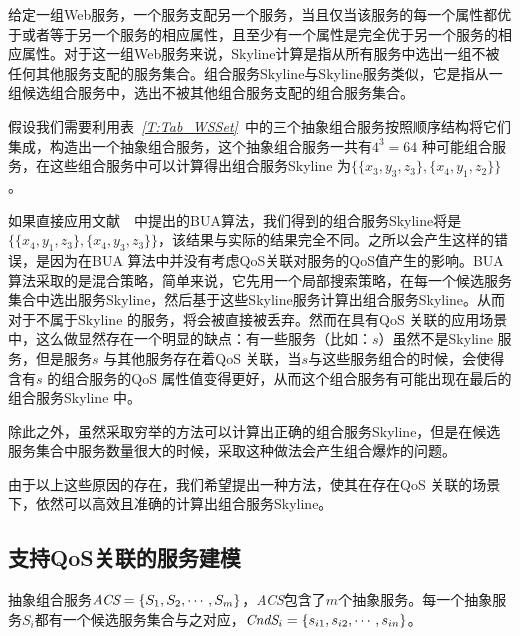 给定一组Web服务，一个服务支配另一个服务，当且仅当该服务的每一个属性都优于或者等于另一个服务的相应属性，且至少有一个属性是完全优于另一个服务的相应属性。对于这一组Web服务来说，Skyline计算是指从所有服务中选出一组不被任何其他服务支配的服务集合。组合服务Skyline与Skyline服务类似，它是指从一组候选组合服务中，选出不被其他组合服务支配的组合服务集合。

\begin{example}[组合服务Skyline]\label{EX:Examp_CSKY}

假设我们需要利用表\emph{~\ref{T:Tab_WSSet}~}中的三个抽象组合服务按照顺序结构将它们集成，构造出一个抽象组合服务，这个抽象组合服务一共有$4^{3}=64$ 种可能组合服务，在这些组合服务中可以计算得出组合服务Skyline 为$\{\{x_{3},y_{3},z_{3}\},\{x_{4},y_{1},z_{2}\}\}$。
\end{example}

如果直接应用文献~\cite{yu2013efficient}~中提出的BUA算法，我们得到的组合服务Skyline将是$\{\{x_{4},y_{1},z_{3}\},\{x_{4},y_{3},z_{3}\}\}$，该结果与实际的结果完全不同。之所以会产生这样的错误，是因为在BUA 算法中并没有考虑QoS关联对服务的QoS值产生的影响。BUA 算法采取的是混合策略，简单来说，它先用一个局部搜索策略，在每一个候选服务集合中选出服务Skyline，然后基于这些Skyline服务计算出组合服务Skyline。从而对于不属于Skyline 的服务，将会被直接被丢弃。然而在具有QoS 关联的应用场景中，这么做显然存在一个明显的缺点：有一些服务（比如：$s$）虽然不是Skyline 服务，但是服务$s$ 与其他服务存在着QoS 关联，当$s$与这些服务组合的时候，会使得含有$s$ 的组合服务的QoS 属性值变得更好，从而这个组合服务有可能出现在最后的组合服务Skyline 中。

除此之外，虽然采取穷举的方法可以计算出正确的组合服务Skyline，但是在候选服务集合中服务数量很大的时候，采取这种做法会产生组合爆炸的问题。

由于以上这些原因的存在，我们希望提出一种方法，使其在存在QoS 关联的场景下，依然可以高效且准确的计算出组合服务Skyline。

%

\subsection{支持QoS关联的服务建模}\label{S:SEC_CorrModel}

\begin{definition}[抽象组合服务]

抽象组合服务$\emph{ACS}=\{S_{1}, S_{2}, \cdots, S_{m}\}$，\emph{ACS}包含了$m$个抽象服务。每一个抽象服务$S_{i}$都有一个候选服务集合与之对应，$\emph{CndS}_{i}=\{s_{i1}, s_{i2}, \cdots, s_{in}\}$。

\end{definition}

